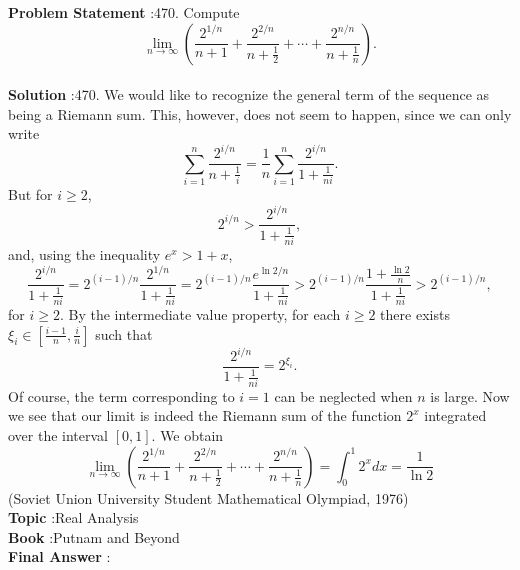 \documentclass[10pt]{article}
\begin{document}
\textbf{Problem Statement} :470. Compute$$ \lim _{n \rightarrow \infty}\left(\frac{2^{1 / n}}{n+1}+\frac{2^{2 / n}}{n+\frac{1}{2}}+\cdots+\frac{2^{n / n}}{n+\frac{1}{n}}\right) . $$\\
\textbf{Solution} :470. We would like to recognize the general term of the sequence as being a Riemann sum. This, however, does not seem to happen, since we can only write$$ \sum_{i=1}^{n} \frac{2^{i / n}}{n+\frac{1}{i}}=\frac{1}{n} \sum_{i=1}^{n} \frac{2^{i / n}}{1+\frac{1}{n i}} . $$But for $i \geq 2$,$$ 2^{i / n}>\frac{2^{i / n}}{1+\frac{1}{n i}}, $$and, using the inequality $e^{x}>1+x$,$$ \frac{2^{i / n}}{1+\frac{1}{n i}}=2^{(i-1) / n} \frac{2^{1 / n}}{1+\frac{1}{n i}}=2^{(i-1) / n} \frac{e^{\ln 2 / n}}{1+\frac{1}{n i}}>2^{(i-1) / n} \frac{1+\frac{\ln 2}{n}}{1+\frac{1}{n i}}>2^{(i-1) / n}, $$for $i \geq 2$. By the intermediate value property, for each $i \geq 2$ there exists $\xi_{i} \in\left[\frac{i-1}{n}, \frac{i}{n}\right]$ such that$$ \frac{2^{i / n}}{1+\frac{1}{n i}}=2^{\xi_{i}} . $$Of course, the term corresponding to $i=1$ can be neglected when $n$ is large. Now we see that our limit is indeed the Riemann sum of the function $2^{x}$ integrated over the interval $[0,1]$. We obtain$$ \lim _{n \rightarrow \infty}\left(\frac{2^{1 / n}}{n+1}+\frac{2^{2 / n}}{n+\frac{1}{2}}+\cdots+\frac{2^{n / n}}{n+\frac{1}{n}}\right)=\int_{0}^{1} 2^{x} d x=\frac{1}{\ln 2} $$(Soviet Union University Student Mathematical Olympiad, 1976)\\
\textbf{Topic} :Real Analysis\\
\textbf{Book} :Putnam and Beyond\\
\textbf{Final Answer} :\\
\end{document}
